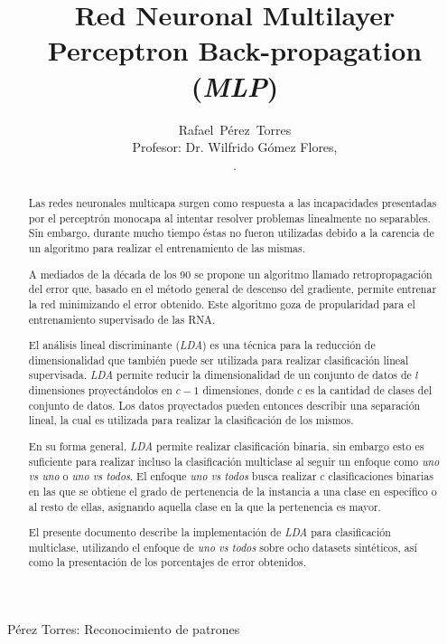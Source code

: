 \documentclass[journal]{IEEEtran}
\begin{document}

\title{Red Neuronal Multilayer Perceptron Back-propagation (\emph{MLP})}

\author{Rafael~Pérez~Torres \\
	Profesor: Dr. Wilfrido Gómez Flores,\\[6pt].
	
}

%
{Pérez Torres: Reconocimiento de patrones}

\maketitle

\begin{abstract}
Las redes neuronales multicapa surgen como respuesta a las incapacidades presentadas por el perceptrón monocapa al intentar resolver problemas linealmente no separables.
Sin embargo, durante mucho tiempo éstas no fueron utilizadas debido a la carencia de un algoritmo para realizar el entrenamiento de las mismas.

A mediados de la década de los 90 se propone un algoritmo llamado retropropagación del error que, basado en el método general de descenso del gradiente, permite entrenar la red minimizando el error obtenido.
Este algoritmo goza de propularidad para el entrenamiento supervisado de las RNA.



El análisis lineal discriminante (\emph{LDA}) es una técnica para la reducción de dimensionalidad que también puede ser utilizada para realizar clasificación lineal supervisada.
\emph{LDA} permite reducir la dimensionalidad de un conjunto de datos de $l$ dimensiones proyectándolos en $c-1$ dimensiones, donde $c$ es la cantidad de clases del conjunto de datos.
Los datos proyectados pueden entonces describir una separación lineal, la cual es utilizada para realizar la clasificación de los mismos.

En su forma general, \emph{LDA} permite realizar clasificación binaria, sin embargo esto es suficiente para realizar incluso la clasificación multiclase al seguir un enfoque como \emph{uno vs uno} o \emph{uno vs todos}.
El enfoque \emph{uno vs todos} busca realizar $c$ clasificaciones binarias en las que se obtiene el grado de pertenencia de la instancia a una clase en específico o al resto de ellas, asignando aquella clase en la que la pertenencia es mayor.

El presente documento describe la implementación de \emph{LDA} para clasificación multiclase, utilizando el enfoque de \emph{uno vs todos} sobre ocho datasets sintéticos, así como la presentación de los porcentajes de error obtenidos.
\end{abstract}
\end{document}
